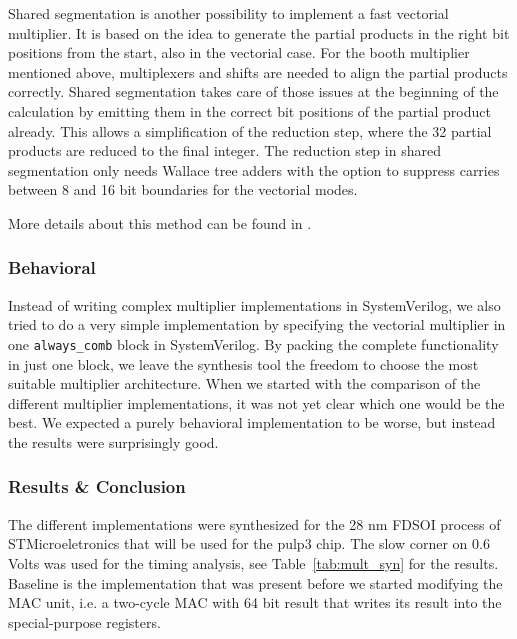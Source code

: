 Shared segmentation is another possibility to implement a fast vectorial
multiplier. It is based on the idea to generate the partial products in the
right bit positions from the start, also in the vectorial case. For the booth
multiplier mentioned above, multiplexers and shifts are needed to align the partial
products correctly. Shared segmentation takes care of those issues at the
beginning of the calculation by emitting them in the correct bit positions of
the partial product already. This allows a simplification of the reduction step,
where the 32 partial products are reduced to the final integer. The reduction
step in shared segmentation only needs Wallace tree adders with the option to
suppress carries between 8 and 16 bit boundaries for the vectorial modes.

More details about this method can be found in \cite{SharedSeg}.




\subsubsection{Behavioral}

Instead of writing complex multiplier implementations in SystemVerilog, we also
tried to do a very simple implementation by specifying the vectorial multiplier
in one \texttt{always\_comb} block in SystemVerilog. By packing the complete
functionality in just one block, we leave the synthesis tool the freedom to
choose the most suitable multiplier architecture. When we started with the
comparison of the different multiplier implementations, it was not yet clear
which one would be the best. We expected a purely behavioral implementation to
be worse, but instead the results were surprisingly good.



\subsubsection{Results \& Conclusion}

The different implementations were synthesized for the 28 nm FDSOI process of
STMicroeletronics that will be used for the pulp3 chip. The slow corner on $0.6$
Volts was used for the timing analysis, see Table~\ref{tab:mult_syn} for the
results.
Baseline is the implementation that was present before we started modifying the
\gls{MAC} unit, i.e. a two-cycle \gls{MAC} with 64 bit result that writes its
result into the special-purpose registers.

